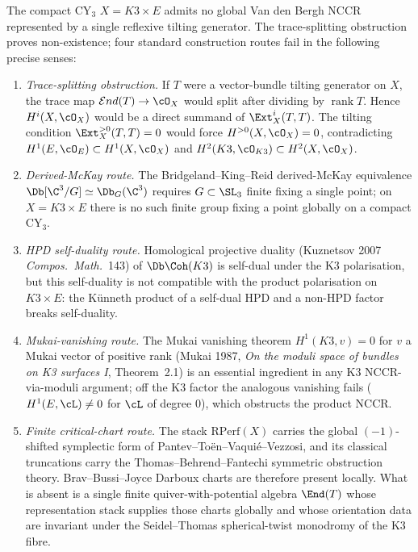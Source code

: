 \begin{theorem}
\label{gluing:thm:five-obstructions-NCCR}
The compact CY$_3$ $X = K3 \times E$ admits no global Van den Bergh
NCCR represented by a single reflexive tilting generator. The
trace-splitting obstruction proves non-existence; four standard
construction routes fail in the following precise senses:
\begin{enumerate}[label=\textup{(\alph*)}]
 \item \emph{Trace-splitting obstruction.} If $T$ were a vector-bundle
 tilting generator on $X$, the trace map
 $\mathcal End(T)\to\cO_X$ would split after dividing by
 $\operatorname{rank}T$. Hence $H^i(X,\cO_X)$ would be a direct summand
 of $\Ext^i_X(T,T)$. The tilting condition
 $\Ext_X^{>0}(T,T)=0$ would force $H^{>0}(X,\cO_X)=0$, contradicting
 $H^1(E,\cO_E)\subset H^1(X,\cO_X)$ and
 $H^2(K3,\cO_{K3})\subset H^2(X,\cO_X)$.
 \item \emph{Derived-McKay route.} The Bridgeland--King--Reid
 derived-McKay equivalence $\Db[\C^3/G] \simeq \Db_G(\C^3)$ requires
 $G \subset \SL_3$ finite fixing a single point; on $X = K3 \times E$
 there is no such finite group fixing a point globally on a compact
 CY$_3$.
 \item \emph{HPD self-duality route.} Homological projective
 duality (Kuznetsov 2007 \emph{Compos.\ Math.}~143) of $\Db\Coh(K3)$
 is self-dual under the K3 polarisation, but this self-duality is
 not compatible with the product polarisation on $K3 \times E$:
 the K\"unneth product of a self-dual HPD and a non-HPD factor
 breaks self-duality.
 \item \emph{Mukai-vanishing route.} The Mukai
 vanishing theorem $H^1(K3, v) = 0$ for $v$ a Mukai vector of
 positive rank (Mukai 1987, \emph{On the moduli space of bundles on
 K3 surfaces I}, Theorem~2.1) is an essential ingredient in any
 K3 NCCR-via-moduli argument; off the K3 factor the analogous
 vanishing fails ($H^1(E, \cL) \neq 0$ for $\cL$ of degree $0$),
 which obstructs the product NCCR.
 \item \emph{Finite critical-chart route.} The stack
 $\mathrm{RPerf}(X)$ carries the global $(-1)$-shifted symplectic
 form of Pantev--To\"en--Vaqui\'e--Vezzosi, and its classical
 truncations carry the Thomas--Behrend--Fantechi symmetric obstruction
 theory. Brav--Bussi--Joyce Darboux charts are therefore present
 locally. What is absent is a single finite quiver-with-potential
 algebra $\End(T)$ whose representation stack supplies those charts
 globally and whose orientation data are invariant under the
 Seidel--Thomas spherical-twist monodromy of the K3 fibre.
\end{enumerate}
\end{theorem}

